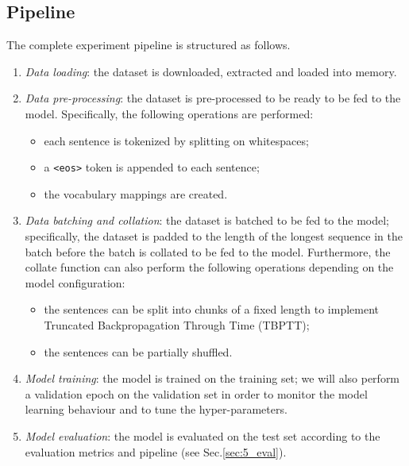 \subsection{Pipeline}
The complete experiment pipeline is structured as follows.
\begin{enumerate}
    \item \emph{Data loading}: the dataset is downloaded, extracted and loaded into memory.
    \item \emph{Data pre-processing}: the dataset is pre-processed to be ready to be fed to the model. Specifically, the following operations are performed:
    \begin{itemize} 
        \item each sentence is tokenized by splitting on whitespaces;
        \item a \texttt{<eos>} token is appended to each sentence;
        \item the vocabulary mappings are created.
    \end{itemize}
    \item \emph{Data batching and  collation}: the dataset is batched to be fed to the model; specifically, the dataset is padded to the length of the longest sequence in the batch before the batch is collated to be fed to the model. Furthermore, the collate function can also perform the following operations depending on the model configuration:
    \begin{itemize}
        \item the sentences can be split into chunks of a fixed length to implement Truncated Backpropagation Through Time (TBPTT);
        \item the sentences can be partially shuffled.
    \end{itemize}
    \item \emph{Model training}: the model is trained on the training set; we will also perform a validation epoch on the validation set in order to monitor the model learning behaviour and to tune the hyper-parameters.
    \item \emph{Model evaluation}: the model is evaluated on the test set according to the evaluation metrics and pipeline (see Sec.\ref{sec:5_eval}).
\end{enumerate}

